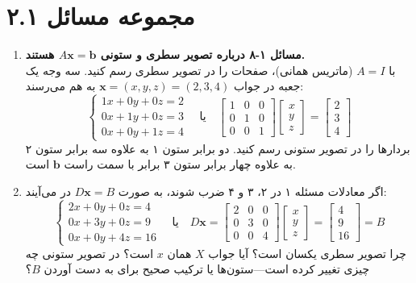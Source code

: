 \documentclass[12pt, a4paper]{book}
\begin{document}
	
	\newpage
	\section*{مجموعه مسائل ۲.۱}
	\begin{enumerate}[label=\arabic*.]
		\item 
		\textbf{مسائل ۱-۸ درباره تصویر سطری و ستونی \(A\mathbf{x}=\mathbf{b}\) هستند.} \\
		با $A=I$ (ماتریس همانی)، صفحات را در تصویر سطری رسم کنید. سه وجه یک جعبه در جواب $\mathbf{x}=(x,y,z)=(2,3,4)$ به هم می‌رسند:
		\[
		\begin{cases}
			1x+0y+0z = 2 \\
			0x+1y+0z = 3 \\
			0x+0y+1z = 4
		\end{cases}
		\quad \text{یا} \quad
		\begin{bmatrix}
			1 & 0 & 0 \\ 0 & 1 & 0 \\ 0 & 0 & 1
		\end{bmatrix}
		\begin{bmatrix} x \\ y \\ z \end{bmatrix}
		=
		\begin{bmatrix} 2 \\ 3 \\ 4 \end{bmatrix}
		\]
		بردارها را در تصویر ستونی رسم کنید. دو برابر ستون ۱ به علاوه سه برابر ستون ۲ به علاوه چهار برابر ستون ۳ برابر با سمت راست $\mathbf{b}$ است.
		
		\item 
		اگر معادلات مسئله ۱ در ۲، ۳ و ۴ ضرب شوند، به صورت $D\mathbf{x}=B$ در می‌آیند:
		\[
		\begin{cases}
			2x+0y+0z = 4 \\
			0x+3y+0z = 9 \\
			0x+0y+4z = 16
		\end{cases}
		\quad \text{یا} \quad
		D\mathbf{x}=
		\begin{bmatrix}
			2 & 0 & 0 \\ 0 & 3 & 0 \\ 0 & 0 & 4
		\end{bmatrix}
		\begin{bmatrix} x \\ y \\ z \end{bmatrix}
		=
		\begin{bmatrix} 4 \\ 9 \\ 16 \end{bmatrix} = B
		\]
		چرا تصویر سطری یکسان است؟ آیا جواب $X$ همان $x$ است؟ در تصویر ستونی چه چیزی تغییر کرده است—ستون‌ها یا ترکیب صحیح برای به دست آوردن $B$؟
		

\end{enumerate}
\end{document}

